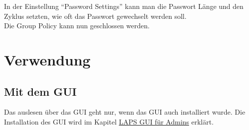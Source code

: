 In der Einstellung ``Password Settings'' kann man die Passwort Länge und den Zyklus setzten, wie oft das Passwort gewechselt werden soll.\\

Die Group Policy kann nun geschlossen werden.


\section{Verwendung}
\subsection{Mit dem GUI}\label{subsec:laps-gui-usage}
Das auslesen über das GUI geht nur, wenn das GUI auch installiert wurde.
Die Installation des GUI wird im Kapitel \hyperref[subsubsec:Laps-Gui]{LAPS GUI für Admins} erklärt.\\

